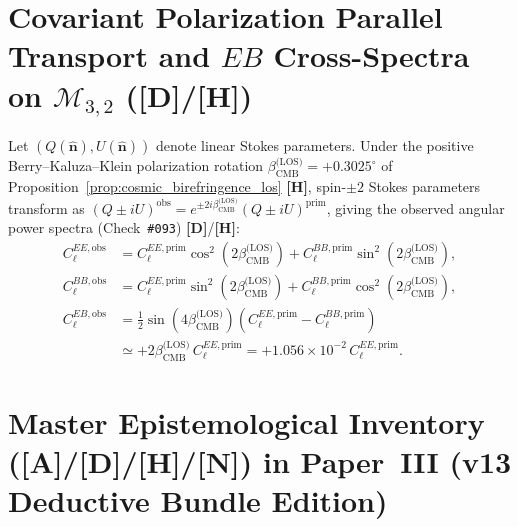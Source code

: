 \documentclass[11pt,a4paper]{article}
\newcommand{\catA}{\textbf{\textcolor{purple!80!black}{[A]}}}
\newcommand{\catD}{\textbf{\textcolor{blue!75!black}{[D]}}}
\newcommand{\catH}{\textbf{\textcolor{orange!85!black}{[H]}}}
\newcommand{\catN}{\textbf{\textcolor{teal!75!black}{[N]}}}
\theoremstyle{plain}
\theoremstyle{definition}
\theoremstyle{remark}
\numberwithin{equation}{section}
\begin{document}
\section{\texorpdfstring{Covariant Polarization Parallel Transport and $EB$ Cross-Spectra on $\mathcal{M}_{3,2}$ (\catD/\catH)}{Covariant Polarization Parallel Transport and EB Cross-Spectra on M_3,2}}
\label{app:polarization_birefringence_derivation}

Let $\left(Q(\hat{\mathbf{n}}), U(\hat{\mathbf{n}})\right)$ denote linear Stokes parameters. Under the positive Berry--Kaluza--Klein polarization rotation $\beta_{\text{CMB}}^{\text{(LOS)}} = +0.3025^\circ$ of Proposition~\ref{prop:cosmic_birefringence_los} \catH, spin-$\pm 2$ Stokes parameters transform as $(Q \pm i U)^{\text{obs}} = e^{\pm 2 i \beta_{\text{CMB}}^{\text{(LOS)}}}(Q \pm i U)^{\text{prim}}$, giving the observed angular power spectra (Check~\texttt{\#093}) \catD/\catH:
\begin{align}
C_\ell^{EE,\text{obs}} &= C_\ell^{EE,\text{prim}} \cos^2\!\left(2\beta_{\text{CMB}}^{\text{(LOS)}}\right) + C_\ell^{BB,\text{prim}} \sin^2\!\left(2\beta_{\text{CMB}}^{\text{(LOS)}}\right), \label{eq:app_cee_obs} \\[4pt]
C_\ell^{BB,\text{obs}} &= C_\ell^{EE,\text{prim}} \sin^2\!\left(2\beta_{\text{CMB}}^{\text{(LOS)}}\right) + C_\ell^{BB,\text{prim}} \cos^2\!\left(2\beta_{\text{CMB}}^{\text{(LOS)}}\right), \label{eq:app_cbb_obs} \\[4pt]
C_\ell^{EB,\text{obs}} &= \frac{1}{2}\sin\!\left(4\beta_{\text{CMB}}^{\text{(LOS)}}\right)\left(C_\ell^{EE,\text{prim}} - C_\ell^{BB,\text{prim}}\right) \nonumber \\[3pt]
&\simeq +2\beta_{\text{CMB}}^{\text{(LOS)}}\,C_\ell^{EE,\text{prim}} = +1.056 \times 10^{-2}\,C_\ell^{EE,\text{prim}}.
\label{eq:app_ceb_obs}
\end{align}

\section{\texorpdfstring{Master Epistemological Inventory (\catA/\catD/\catH/\catN) in Paper~III (v13 Deductive Bundle Edition)}{Master Epistemological Inventory ([A]/[D]/[H]/[N]) in Paper III (v13 Deductive Bundle Edition)}}
\label{app:open_deductive_program_p3}
\end{document}
